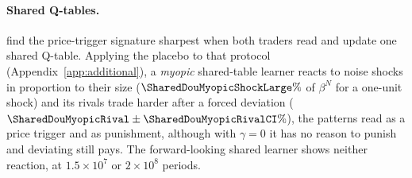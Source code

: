 \paragraph{Shared Q-tables.} \citet{esquinas2026} find the price-trigger
signature sharpest when both traders read and update one shared Q-table.
Applying the placebo to that protocol (Appendix~\ref{app:additional}), a
\emph{myopic} shared-table learner reacts to noise shocks in proportion to
their size ($\SharedDouMyopicShockLarge\%$ of $\beta^N$ for a one-unit shock)
and its rivals trade harder after a forced deviation
($\SharedDouMyopicRival\pm\SharedDouMyopicRivalCI\%$), the patterns read as a
price trigger and as punishment, although with $\gamma=0$ it has no reason to
punish and deviating still pays. The forward-looking shared learner shows
neither reaction, at $1.5\times10^7$ or $2\times10^8$ periods.
